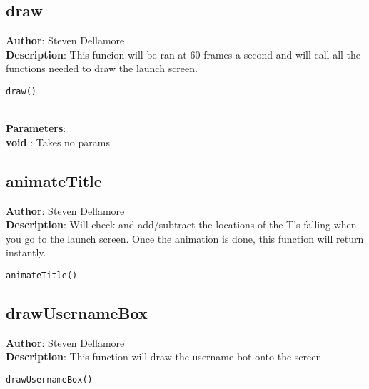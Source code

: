 \documentclass[12pt]{article}
\begin{document}
\subsection{draw}
\textbf{Author}: Steven Dellamore \\
\textbf{Description}: This funcion will be ran at 60 frames a second and will call all the functions needed to draw the launch screen. 

\begin{lstlisting}
draw()
\end{lstlisting}\textbf{\large{\\Parameters}}:\\
\textbf{void }: Takes no params\\

\subsection{animateTitle}
\textbf{Author}: Steven Dellamore \\
\textbf{Description}: Will check and add/subtract the locations of the T's falling when you go to the launch screen. Once the animation is done, this function will return instantly. 

\begin{lstlisting}
animateTitle()
\end{lstlisting}

\subsection{drawUsernameBox}
\textbf{Author}: Steven Dellamore \\
\textbf{Description}: This function will draw the username bot onto the screen 

\begin{lstlisting}
drawUsernameBox()
\end{lstlisting}
\end{document}
